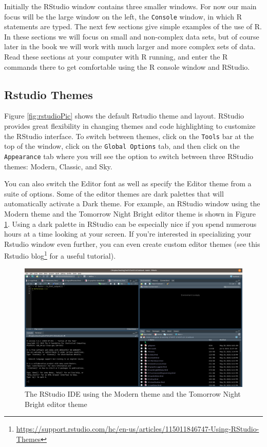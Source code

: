 \documentclass[
]{krantz}
\renewcommand{\href}[2]{#2\footnote{\url{#1}}}
\begin{document}
Initially the RStudio window contains three smaller windows. For now our main focus will be the large window on the left, the \texttt{Console} window, in which R statements are typed. The next few sections give simple examples of the use of R. In these sections we will focus on small and non-complex data sets, but of course later in the book we will work with much larger and more complex sets of data. Read these sections at your computer with R running, and enter the R commands there to get comfortable using the R console window and RStudio.

\hypertarget{rstudio-themes}{%
\subsection{Rstudio Themes}\label{rstudio-themes}}

Figure \ref{fig:rstudioPic} shows the default Rstudio theme and layout. RStudio provides great flexibility in changing themes and code highlighting to customize the RStudio interface. To switch between themes, click on the \texttt{Tools} bar at the top of the window, click on the \texttt{Global\ Options} tab, and then click on the \texttt{Appearance} tab where you will see the option to switch between three RStudio themes: Modern, Classic, and Sky.

You can also switch the Editor font as well as specify the Editor theme from a suite of options. Some of the editor themes are dark palettes that will automatically activate a Dark theme. For example, an RStudio window using the Modern theme and the Tomorrow Night Bright editor theme is shown in Figure \ref{fig:rstudioDark}. Using a dark palette in RStudio can be especially nice if you spend numerous hours at a time looking at your screen. If you're interested in specializing your Rstudio window even further, you can even create custom editor themes (see \href{https://support.rstudio.com/hc/en-us/articles/115011846747-Using-RStudio-Themes}{this Rstudio blog} for a useful tutorial).

\begin{figure}
\includegraphics[width=1\linewidth]{../figures/rstudioDark} \caption{The RStudio IDE using the Modern theme and the Tomorrow Night Bright editor theme}\label{fig:rstudioDark}
\end{figure}
\end{document}
